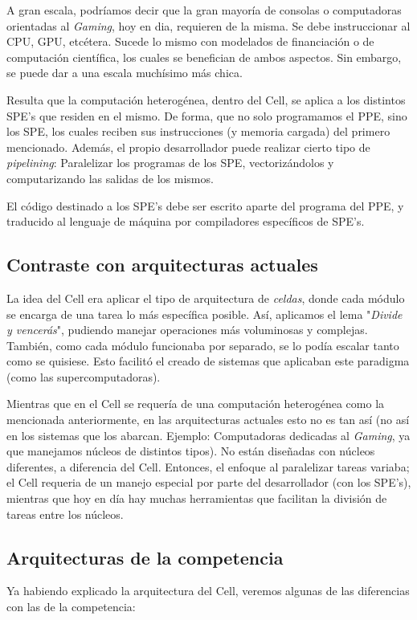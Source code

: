\documentclass[10pt,compsoc]{IEEEtran}
\begin{document}
	A gran escala, podríamos decir que la gran mayoría de consolas o computadoras orientadas al \textit{Gaming}, hoy en dia, requieren de la misma. Se debe instruccionar al CPU, GPU, etcétera. Sucede lo mismo con modelados de financiación o de computación científica, los cuales se benefician de ambos aspectos. Sin embargo, se puede dar a una escala muchísimo más chica.\newline
	
	 Resulta que la computación heterogénea, dentro del Cell, se aplica a los distintos SPE's que residen en el mismo. De forma, que no solo programamos el PPE, sino los SPE, los cuales reciben sus instrucciones (y memoria cargada) del primero mencionado. Además, el propio desarrollador puede realizar cierto tipo de \textit{pipelining}: Paralelizar los programas de los SPE, vectorizándolos y computarizando las salidas de los mismos.\newline
	 
	 El código destinado a los SPE's debe ser escrito aparte del programa del PPE, y traducido al lenguaje de máquina por compiladores específicos de SPE's.
	
	\subsection{Contraste con arquitecturas actuales}
	\noindent La idea del Cell era aplicar el tipo de arquitectura de \textit{celdas}, donde cada módulo se encarga de una tarea lo más específica posible. Así, aplicamos el lema "\textit{Divide y vencerás}", pudiendo manejar operaciones más voluminosas y complejas. También, como cada módulo funcionaba por separado, se lo podía escalar tanto como se quisiese. Esto facilitó el creado de sistemas que aplicaban este paradigma (como las supercomputadoras).\newline
	
	 Mientras que en el Cell se requería de una computación heterogénea como la mencionada anteriormente, en las arquitecturas actuales esto no es tan así (no así en los sistemas que los abarcan. Ejemplo: Computadoras dedicadas al \textit{Gaming}, ya que manejamos núcleos de distintos tipos). No están diseñadas con núcleos diferentes, a diferencia del Cell. Entonces, el enfoque al paralelizar tareas variaba; el Cell requeria de un manejo especial por parte del desarrollador (con los SPE's), mientras que hoy en día hay muchas herramientas que facilitan la división de tareas entre los núcleos.
	
	\subsection{Arquitecturas de la competencia}%
	\noindent Ya habiendo explicado la arquitectura del Cell, veremos algunas de las diferencias con las de la competencia:
	
\end{document}
